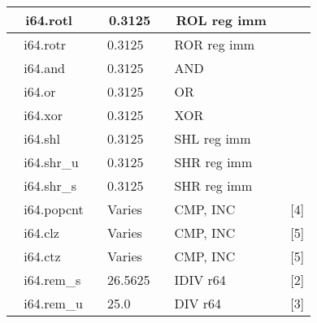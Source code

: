 \documentclass{article}
\begin{document}
\begin{table}
\begin{tabular}{|l|l|l|l|}
\hline
~ i64.rotl                                  & ~ 0.3125                     & ~ ROL reg imm                                        &                       \\
\hline
~ i64.rotr                                  & ~ 0.3125                     & ~ ROR reg imm                                        &                       \\
\hline
~ i64.and                                   & ~ 0.3125                     & ~ AND                                                &                       \\
\hline
~ i64.or                                    & ~ 0.3125                     & ~ OR                                                 &                       \\
\hline
~ i64.xor                                   & ~ 0.3125                     & ~ XOR                                                &                       \\
\hline
~ i64.shl                                   & ~ 0.3125                     & ~ SHL reg imm                                        &                       \\
\hline
~ i64.shr\_u                                & ~ 0.3125                     & ~ SHR reg imm                                        &                       \\
\hline
~ i64.shr\_s                                & ~ 0.3125                     & ~ SHR reg imm                                        &                       \\
\hline
~ i64.popcnt                                & ~ Varies                     & ~ CMP, INC                                           & ~ [4]                 \\
\hline
~ i64.clz                                   & ~ Varies                     & ~ CMP, INC                                           & ~ [5]                 \\
\hline
~ i64.ctz                                   & ~ Varies                     & ~ CMP, INC                                           & ~ [5]                 \\
\hline
~ i64.rem\_s                                & ~ 26.5625                    & ~ IDIV r64                                           & ~ [2]                 \\
\hline
~ i64.rem\_u                                & ~ 25.0                       & ~ DIV r64                                            & ~ [3]                 \\

\end{tabular}
\end{table}
\end{document}
